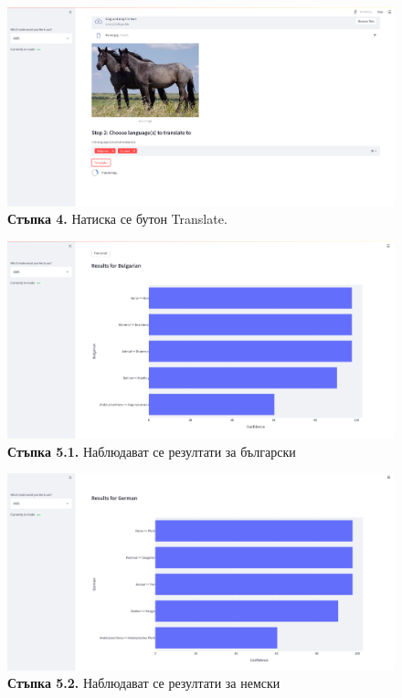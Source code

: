 \documentclass[12pt]{article}
\begin{document}
\begin{figure}[!htp]
\centering
    \includegraphics[scale=0.2]{assets/st4.png}
  \caption{\textbf{Стъпка 4.} Натиска се бутон Translate.}
\end{figure}

\noindent \textbf{} 

\begin{figure}[!htp]
\centering
    \includegraphics[scale=0.2]{assets/st5_1.png}
  \caption{\textbf{Стъпка 5.1.} Наблюдават се резултати за български}
\end{figure}

\begin{figure}[!htp]
\centering
    \includegraphics[scale=0.2]{assets/st5_2.png}
  \caption{\textbf{Стъпка 5.2.} Наблюдават се резултати за немски}
\end{figure}
\end{document}
